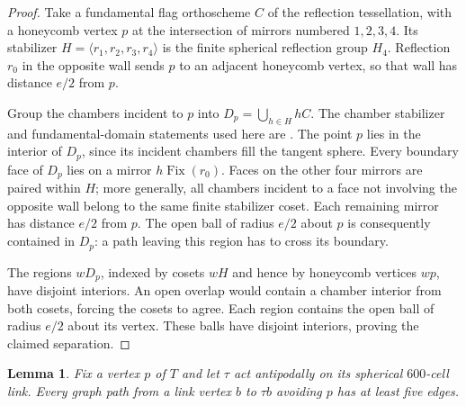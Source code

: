 \documentclass[11pt]{article}
\newtheorem{lemma}[theorem]{Lemma}
\begin{document}
\begin{proof}
Take a fundamental flag orthoscheme $C$ of the reflection tessellation,
with a honeycomb vertex $p$ at the intersection of mirrors numbered
$1,2,3,4$. Its stabilizer
$H=\langle r_1,r_2,r_3,r_4\rangle$ is the finite spherical
reflection group $H_4$. Reflection $r_0$ in the opposite wall
sends $p$ to an adjacent honeycomb vertex, so that wall has
distance $e/2$ from $p$.

Group the chambers incident to $p$ into
$D_p=\bigcup_{h\in H}hC$.
The chamber stabilizer and fundamental-domain statements used here
are \cite[Theorem~4.17, Corollary~4.19 and Proposition~5.8]{Heckman}.
The point $p$ lies in the interior of $D_p$, since its incident
chambers fill the tangent sphere.
Every boundary face of $D_p$ lies on a mirror $h\operatorname{Fix}(r_0)$.
Faces on the other four mirrors are paired within $H$; more generally,
all chambers incident to a face not involving the opposite wall
belong to the same finite stabilizer coset.
Each remaining mirror has distance $e/2$ from $p$.
The open ball of radius $e/2$ about $p$ is consequently contained
in $D_p$: a path leaving this region has to cross its boundary.

The regions $wD_p$, indexed by cosets $wH$ and hence by honeycomb
vertices $wp$, have disjoint interiors. An open overlap would contain
a chamber interior from both cosets, forcing the cosets to agree.
Each region contains the open ball of radius $e/2$ about its vertex.
These balls have disjoint interiors, proving the claimed separation.
\end{proof}

\begin{lemma}\label{lem:paths}
Fix a vertex $p$ of $T$ and let $\tau$ act antipodally on its
spherical $600$-cell link. Every graph path from a link vertex
$b$ to $\tau b$ avoiding $p$ has at least five edges.
\end{lemma}
\end{document}
